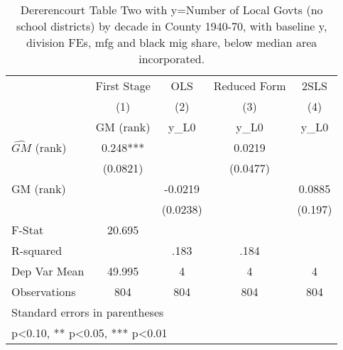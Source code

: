 \begin{table}[htbp]\centering
\def\sym#1{\ifmmode^{#1}\else\(^{#1}\)\fi}
\caption{Dererencourt Table Two with y=Number of Local Govts (no school districts) by decade in County 1940-70, with baseline y, division FEs, mfg and black mig share, below median area incorporated.}
\begin{tabular}{l*{4}{c}}
\toprule
                    & First Stage   &         OLS   &Reduced Form   &        2SLS   \\
                    &\multicolumn{1}{c}{(1)}&\multicolumn{1}{c}{(2)}&\multicolumn{1}{c}{(3)}&\multicolumn{1}{c}{(4)}\\
                    &\multicolumn{1}{c}{GM  (rank)}&\multicolumn{1}{c}{y\_L0}&\multicolumn{1}{c}{y\_L0}&\multicolumn{1}{c}{y\_L0}\\
\midrule
$\hat{GM}$ (rank)   &       0.248***&               &      0.0219   &               \\
                    &    (0.0821)   &               &    (0.0477)   &               \\
\addlinespace
GM  (rank)          &               &     -0.0219   &               &      0.0885   \\
                    &               &    (0.0238)   &               &     (0.197)   \\
\midrule
F-Stat              &      20.695   &               &               &               \\
R-squared           &               &        .183   &        .184   &               \\
Dep Var Mean        &      49.995   &           4   &           4   &           4   \\
Observations        &         804   &         804   &         804   &         804   \\
\bottomrule
\multicolumn{5}{l}{\footnotesize Standard errors in parentheses}\\
\multicolumn{5}{l}{\footnotesize * p<0.10, ** p<0.05, *** p<0.01}\\
\end{tabular}
\end{table}
